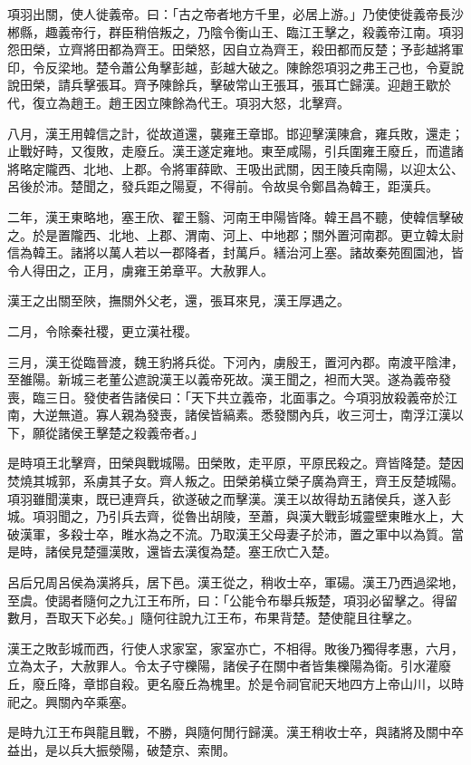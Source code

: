 \begin{pinyinscope}
項羽出關，使人徙義帝。曰：「古之帝者地方千里，必居上游。」乃使使徙義帝長沙郴縣，趣義帝行，群臣稍倍叛之，乃陰令衡山王、臨江王擊之，殺義帝江南。項羽怨田榮，立齊將田都為齊王。田榮怒，因自立為齊王，殺田都而反楚；予彭越將軍印，令反梁地。楚令蕭公角擊彭越，彭越大破之。陳餘怨項羽之弗王己也，令夏說說田榮，請兵擊張耳。齊予陳餘兵，擊破常山王張耳，張耳亡歸漢。迎趙王歇於代，復立為趙王。趙王因立陳餘為代王。項羽大怒，北擊齊。

八月，漢王用韓信之計，從故道還，襲雍王章邯。邯迎擊漢陳倉，雍兵敗，還走；止戰好畤，又復敗，走廢丘。漢王遂定雍地。東至咸陽，引兵圍雍王廢丘，而遣諸將略定隴西、北地、上郡。令將軍薛歐、王吸出武關，因王陵兵南陽，以迎太公、呂後於沛。楚聞之，發兵距之陽夏，不得前。令故吳令鄭昌為韓王，距漢兵。

二年，漢王東略地，塞王欣、翟王翳、河南王申陽皆降。韓王昌不聽，使韓信擊破之。於是置隴西、北地、上郡、渭南、河上、中地郡；關外置河南郡。更立韓太尉信為韓王。諸將以萬人若以一郡降者，封萬戶。繕治河上塞。諸故秦苑囿園池，皆令人得田之，正月，虜雍王弟章平。大赦罪人。

漢王之出關至陜，撫關外父老，還，張耳來見，漢王厚遇之。

二月，令除秦社稷，更立漢社稷。

三月，漢王從臨晉渡，魏王豹將兵從。下河內，虜殷王，置河內郡。南渡平陰津，至雒陽。新城三老董公遮說漢王以義帝死故。漢王聞之，袒而大哭。遂為義帝發喪，臨三日。發使者告諸侯曰：「天下共立義帝，北面事之。今項羽放殺義帝於江南，大逆無道。寡人親為發喪，諸侯皆縞素。悉發關內兵，收三河士，南浮江漢以下，願從諸侯王擊楚之殺義帝者。」

是時項王北擊齊，田榮與戰城陽。田榮敗，走平原，平原民殺之。齊皆降楚。楚因焚燒其城郭，系虜其子女。齊人叛之。田榮弟橫立榮子廣為齊王，齊王反楚城陽。項羽雖聞漢東，既已連齊兵，欲遂破之而擊漢。漢王以故得劫五諸侯兵，遂入彭城。項羽聞之，乃引兵去齊，從魯出胡陵，至蕭，與漢大戰彭城靈壁東睢水上，大破漢軍，多殺士卒，睢水為之不流。乃取漢王父母妻子於沛，置之軍中以為質。當是時，諸侯見楚彊漢敗，還皆去漢復為楚。塞王欣亡入楚。

呂后兄周呂侯為漢將兵，居下邑。漢王從之，稍收士卒，軍碭。漢王乃西過梁地，至虞。使謁者隨何之九江王布所，曰：「公能令布舉兵叛楚，項羽必留擊之。得留數月，吾取天下必矣。」隨何往說九江王布，布果背楚。楚使龍且往擊之。

漢王之敗彭城而西，行使人求家室，家室亦亡，不相得。敗後乃獨得孝惠，六月，立為太子，大赦罪人。令太子守櫟陽，諸侯子在關中者皆集櫟陽為衛。引水灌廢丘，廢丘降，章邯自殺。更名廢丘為槐里。於是令祠官祀天地四方上帝山川，以時祀之。興關內卒乘塞。

是時九江王布與龍且戰，不勝，與隨何閒行歸漢。漢王稍收士卒，與諸將及關中卒益出，是以兵大振滎陽，破楚京、索閒。


\end{pinyinscope}
